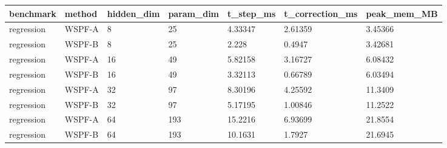 \begin{tabular}{lllllll}
\hline
benchmark & method & hidden\_dim & param\_dim & t\_step\_ms & t\_correction\_ms & peak\_mem\_MB \\
\hline
regression & WSPF-A & 8 & 25 & 4.33347 & 2.61359 & 3.45366 \\
regression & WSPF-B & 8 & 25 & 2.228 & 0.4947 & 3.42681 \\
regression & WSPF-A & 16 & 49 & 5.82158 & 3.16727 & 6.08432 \\
regression & WSPF-B & 16 & 49 & 3.32113 & 0.66789 & 6.03494 \\
regression & WSPF-A & 32 & 97 & 8.30196 & 4.25592 & 11.3409 \\
regression & WSPF-B & 32 & 97 & 5.17195 & 1.00846 & 11.2522 \\
regression & WSPF-A & 64 & 193 & 15.2216 & 6.93699 & 21.8554 \\
regression & WSPF-B & 64 & 193 & 10.1631 & 1.7927 & 21.6945 \\
\hline
\end{tabular}
